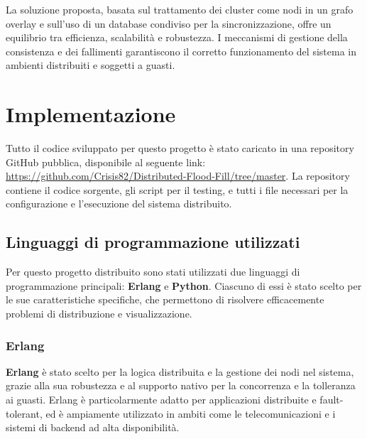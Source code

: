 \documentclass[12pt, a4paper]{report}
\begin{document}
La soluzione proposta, basata sul trattamento dei cluster come nodi in un grafo overlay e sull'uso di un database condiviso per la sincronizzazione, offre un equilibrio tra efficienza, scalabilit\`a e robustezza. I meccanismi di gestione della consistenza e dei fallimenti garantiscono il corretto funzionamento del sistema in ambienti distribuiti e soggetti a guasti.

\newpage

\chapter{Implementazione}

Tutto il codice sviluppato per questo progetto è stato caricato in una repository GitHub pubblica, disponibile al seguente link:
\url{https://github.com/Crisis82/Distributed-Flood-Fill/tree/master}. La repository contiene il codice sorgente, gli script per il testing, e tutti i file necessari per la configurazione e l'esecuzione del sistema distribuito.


\section{Linguaggi di programmazione utilizzati}

Per questo progetto distribuito sono stati utilizzati due linguaggi di programmazione principali: \textbf{Erlang} e \textbf{Python}. Ciascuno di essi \`e stato scelto per le sue caratteristiche specifiche, che permettono di risolvere efficacemente problemi di distribuzione e visualizzazione.

\subsection{Erlang}

\textbf{Erlang} \`e stato scelto per la logica distribuita e la gestione dei nodi nel sistema, grazie alla sua robustezza e al supporto nativo per la concorrenza e la tolleranza ai guasti. Erlang \`e particolarmente adatto per applicazioni distribuite e fault-tolerant, ed \`e ampiamente utilizzato in ambiti come le telecomunicazioni e i sistemi di backend ad alta disponibilità.
\end{document}
